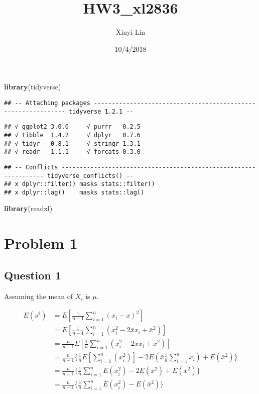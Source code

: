 \documentclass[]{article}
\title{HW3\_xl2836}
\author{Xinyi Lin}
\date{10/4/2018}
\newenvironment{Shaded}{\begin{snugshade}}{\end{snugshade}}
\newcommand{\KeywordTok}[1]{\textcolor[rgb]{0.13,0.29,0.53}{\textbf{#1}}}
\newcommand{\NormalTok}[1]{#1}
\begin{document}
\maketitle

\begin{Shaded}
\begin{Highlighting}[]
\KeywordTok{library}\NormalTok{(tidyverse)}
\end{Highlighting}
\end{Shaded}

\begin{verbatim}
## -- Attaching packages -------------------------------------------------------------- tidyverse 1.2.1 --
\end{verbatim}

\begin{verbatim}
## √ ggplot2 3.0.0     √ purrr   0.2.5
## √ tibble  1.4.2     √ dplyr   0.7.6
## √ tidyr   0.8.1     √ stringr 1.3.1
## √ readr   1.1.1     √ forcats 0.3.0
\end{verbatim}

\begin{verbatim}
## -- Conflicts ----------------------------------------------------------------- tidyverse_conflicts() --
## x dplyr::filter() masks stats::filter()
## x dplyr::lag()    masks stats::lag()
\end{verbatim}

\begin{Shaded}
\begin{Highlighting}[]
\KeywordTok{library}\NormalTok{(readxl)}
\end{Highlighting}
\end{Shaded}

\section{Problem 1}\label{problem-1}

\subsection{Question 1}\label{question-1}

Assuming the mean of \(X_i\) is \(\mu\).

\[\begin{split}
E(s^2) & =E[\frac{1}{n-1}\sum_{i=1}^n(x_i-x)^2]\\
& =E[\frac{1}{n-1}\sum_{i=1}^n(x_i^2-2\bar{x}x_i+\bar{x}^2)] \\
& =\frac{n}{n-1}E[\frac{1}{n}\sum_{i=1}^n(x_i^2-2\bar{x}x_i+\bar{x}^2)] \\
& =\frac{n}{n-1}\{\frac{1}{n}E[\sum_{i=1}^n(x_i^2)]-2E(\bar{x}\frac{1}{n}\sum_{i=1}^nx_i)+E(\bar{x}^2)\} \\
& =\frac{n}{n-1}\{\frac{1}{n}\sum_{i=1}^nE(x_i^2)-2E(\bar{x}^2)+E(\bar{x}^2)\} \\
& =\frac{n}{n-1}\{\frac{1}{n}\sum_{i=1}^nE(x_i^2)-E(\bar{x}^2)\}
\end{split}\]
\end{document}

